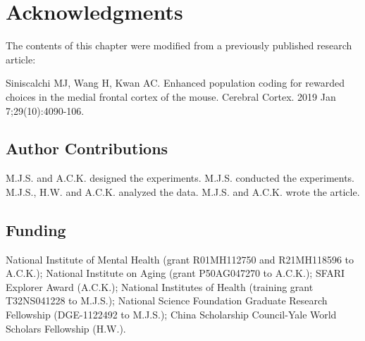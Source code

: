 
\section{Acknowledgments}
The contents of this chapter were modified from a previously published research article: 

\smallskip Siniscalchi MJ, Wang H, Kwan AC. Enhanced population coding for rewarded choices in the medial frontal cortex of the mouse. Cerebral Cortex. 2019 Jan 7;29(10):4090-106.

\subsection*{Author Contributions}
M.J.S. and A.C.K. designed the experiments. M.J.S. conducted the experiments. M.J.S., H.W. and A.C.K. analyzed the data. M.J.S. and A.C.K. wrote the article.

\subsection*{Funding}
National Institute of Mental Health (grant R01MH112750 and R21MH118596 to A.C.K.); National Institute on Aging (grant P50AG047270 to A.C.K.); SFARI Explorer Award (A.C.K.); National Institutes of Health (training grant T32NS041228 to M.J.S.); National Science Foundation Graduate Research Fellowship (DGE-1122492 to M.J.S.); China Scholarship Council-Yale World Scholars Fellowship (H.W.).